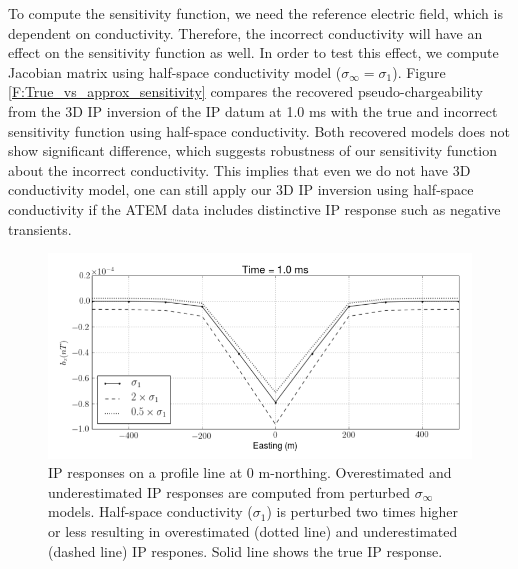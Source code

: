 \documentclass[a4paper, 11pt]{article}
\newcommand{\siginf}{\sigma_\infty}
\begin{document}
To compute the sensitivity function, we need the reference electric field, which is dependent on conductivity. 
Therefore, the incorrect conductivity will have an effect on the sensitivity function as well. 
In order to test this effect, we compute Jacobian matrix using half-space conductivity model ($\siginf = \sigma_1$). 
Figure \ref{F:True_vs_approx_sensitivity} compares the recovered pseudo-chargeability from the 3D IP inversion of the IP datum at 1.0 ms with the true and incorrect sensitivity function using half-space conductivity. 
Both recovered models does not show significant difference, which suggests robustness of our sensitivity function about the incorrect conductivity. 
This implies that even we do not have 3D conductivity model, one can still apply our 3D IP inversion using half-space conductivity if the ATEM data includes distinctive IP response such as negative transients. 

\begin{figure}[htb]
  \centering
  \includegraphics[width=1.\textwidth]{figures/Reg_IPresp.png}
  \caption{IP responses on a profile line at 0 m-northing. Overestimated and underestimated IP responses are computed from perturbed $\siginf$ models. Half-space conductivity ($\sigma_1$) is perturbed two times higher or less resulting in overestimated (dotted line) and underestimated (dashed line) IP respones. Solid line shows the true IP response. }
  \label{F:Reg_IPresp}
\end{figure}
\end{document}
